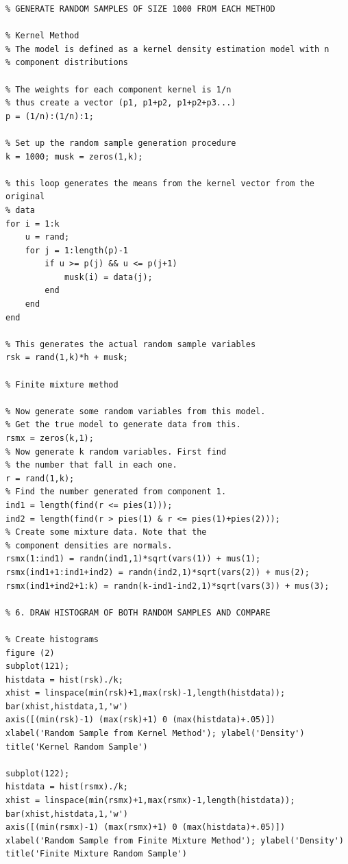 \documentclass[12pt,a4paper]{article}
\begin{document}
\begin{verbatim}
% GENERATE RANDOM SAMPLES OF SIZE 1000 FROM EACH METHOD

% Kernel Method
% The model is defined as a kernel density estimation model with n
% component distributions

% The weights for each component kernel is 1/n
% thus create a vector (p1, p1+p2, p1+p2+p3...)
p = (1/n):(1/n):1;

% Set up the random sample generation procedure
k = 1000; musk = zeros(1,k);

% this loop generates the means from the kernel vector from the original
% data
for i = 1:k
    u = rand;
    for j = 1:length(p)-1
        if u >= p(j) && u <= p(j+1)
            musk(i) = data(j);
        end
    end
end

% This generates the actual random sample variables
rsk = rand(1,k)*h + musk;

% Finite mixture method

% Now generate some random variables from this model.
% Get the true model to generate data from this.
rsmx = zeros(k,1);
% Now generate k random variables. First find
% the number that fall in each one.
r = rand(1,k);
% Find the number generated from component 1.
ind1 = length(find(r <= pies(1)));
ind2 = length(find(r > pies(1) & r <= pies(1)+pies(2)));
% Create some mixture data. Note that the 
% component densities are normals.
rsmx(1:ind1) = randn(ind1,1)*sqrt(vars(1)) + mus(1);
rsmx(ind1+1:ind1+ind2) = randn(ind2,1)*sqrt(vars(2)) + mus(2);
rsmx(ind1+ind2+1:k) = randn(k-ind1-ind2,1)*sqrt(vars(3)) + mus(3);

% 6. DRAW HISTOGRAM OF BOTH RANDOM SAMPLES AND COMPARE

% Create histograms 
figure (2)
subplot(121);
histdata = hist(rsk)./k;
xhist = linspace(min(rsk)+1,max(rsk)-1,length(histdata));
bar(xhist,histdata,1,'w')
axis([(min(rsk)-1) (max(rsk)+1) 0 (max(histdata)+.05)]) 
xlabel('Random Sample from Kernel Method'); ylabel('Density')
title('Kernel Random Sample')

subplot(122);
histdata = hist(rsmx)./k;
xhist = linspace(min(rsmx)+1,max(rsmx)-1,length(histdata));
bar(xhist,histdata,1,'w')
axis([(min(rsmx)-1) (max(rsmx)+1) 0 (max(histdata)+.05)])
xlabel('Random Sample from Finite Mixture Method'); ylabel('Density')
title('Finite Mixture Random Sample')
\end{verbatim}
\end{document}
